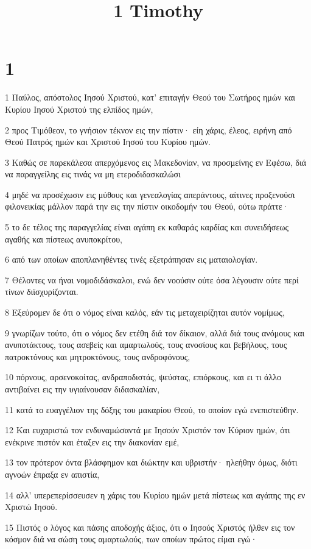 

\title{1 Timothy}


\chapter{1}

\par 1 Παύλος, απόστολος Ιησού Χριστού, κατ' επιταγήν Θεού του Σωτήρος ημών και Κυρίου Ιησού Χριστού της ελπίδος ημών,
\par 2 προς Τιμόθεον, το γνήσιον τέκνον εις την πίστιν· είη χάρις, έλεος, ειρήνη από Θεού Πατρός ημών και Χριστού Ιησού του Κυρίου ημών.
\par 3 Καθώς σε παρεκάλεσα απερχόμενος εις Μακεδονίαν, να προσμείνης εν Εφέσω, διά να παραγγείλης εις τινάς να μη ετεροδιδασκαλώσι
\par 4 μηδέ να προσέχωσιν εις μύθους και γενεαλογίας απεράντους, αίτινες προξενούσι φιλονεικίας μάλλον παρά την εις την πίστιν οικοδομήν του Θεού, ούτω πράττε·
\par 5 το δε τέλος της παραγγελίας είναι αγάπη εκ καθαράς καρδίας και συνειδήσεως αγαθής και πίστεως ανυποκρίτου,
\par 6 από των οποίων αποπλανηθέντες τινές εξετράπησαν εις ματαιολογίαν.
\par 7 Θέλοντες να ήναι νομοδιδάσκαλοι, ενώ δεν νοούσιν ούτε όσα λέγουσιν ούτε περί τίνων διϊσχυρίζονται.
\par 8 Εξεύρομεν δε ότι ο νόμος είναι καλός, εάν τις μεταχειρίζηται αυτόν νομίμως,
\par 9 γνωρίζων τούτο, ότι ο νόμος δεν ετέθη διά τον δίκαιον, αλλά διά τους ανόμους και ανυποτάκτους, τους ασεβείς και αμαρτωλούς, τους ανοσίους και βεβήλους, τους πατροκτόνους και μητροκτόνους, τους ανδροφόνους,
\par 10 πόρνους, αρσενοκοίτας, ανδραποδιστάς, ψεύστας, επιόρκους, και ει τι άλλο αντιβαίνει εις την υγιαίνουσαν διδασκαλίαν,
\par 11 κατά το ευαγγέλιον της δόξης του μακαρίου Θεού, το οποίον εγώ ενεπιστεύθην.
\par 12 Και ευχαριστώ τον ενδυναμώσαντά με Ιησούν Χριστόν τον Κύριον ημών, ότι ενέκρινε πιστόν και έταξεν εις την διακονίαν εμέ,
\par 13 τον πρότερον όντα βλάσφημον και διώκτην και υβριστήν· ηλεήθην όμως, διότι αγνοών έπραξα εν απιστία,
\par 14 αλλ' υπερεπερίσσευσεν η χάρις του Κυρίου ημών μετά πίστεως και αγάπης της εν Χριστώ Ιησού.
\par 15 Πιστός ο λόγος και πάσης αποδοχής άξιος, ότι ο Ιησούς Χριστός ήλθεν εις τον κόσμον διά να σώση τους αμαρτωλούς, των οποίων πρώτος είμαι εγώ·
